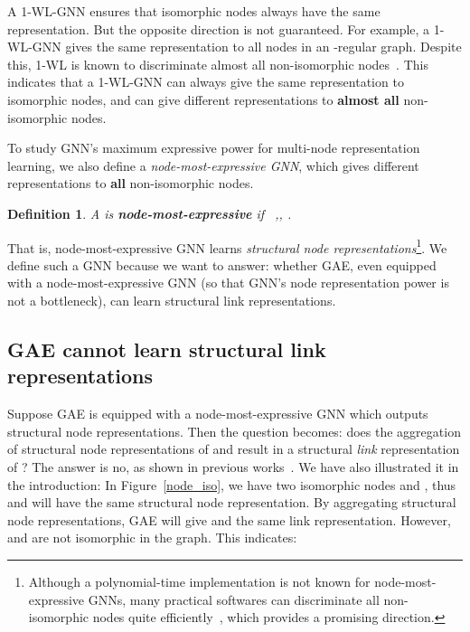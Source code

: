 \documentclass{article}
\newtheorem{definition}{Definition}
\begin{document}
A 1-WL-GNN ensures that isomorphic nodes always have the same representation. But the opposite direction is not guaranteed. For example, a 1-WL-GNN gives the same representation to all nodes in an -regular graph. Despite this, 1-WL is known to discriminate almost all non-isomorphic nodes~\citep{babai1979canonical}. This indicates that a 1-WL-GNN can always give the same representation to isomorphic nodes, and can give different representations to \textbf{almost all} non-isomorphic nodes. 




To study GNN's maximum expressive power for multi-node representation learning, we also define a \textit{node-most-expressive GNN}, which gives different representations to \textbf{all} non-isomorphic nodes.

\begin{definition}
A  is \textbf{node-most-expressive} if ~,, .
\end{definition}
That is, node-most-expressive GNN learns \textit{structural node representations}\footnote{Although a polynomial-time implementation is not known for node-most-expressive GNNs, many practical softwares can discriminate all non-isomorphic nodes quite efficiently~\citep{mckay2014practical}, which provides a promising direction.}. We define such a GNN because we want to answer: whether GAE, even equipped with a node-most-expressive GNN (so that GNN's node representation power is not a bottleneck), can learn structural link representations. 















\subsection{GAE \textbf{cannot} learn structural link representations}\label{gae_limitation}


Suppose GAE is equipped with a node-most-expressive GNN which outputs structural node representations. 
Then the question becomes: does the aggregation of structural node representations of  and  result in a structural \textit{link} representation of ? The answer is no, as shown in previous works~\citep{Srinivasan2020On,Zhang2020Inductive}. We have also illustrated it in the introduction:
In Figure~\ref{node_iso}, we have two isomorphic nodes  and , thus  and  will have the same structural node representation. By aggregating structural node representations, GAE will give  and  the same link representation. However,  and  are not isomorphic in the graph. This indicates:
\end{document}
